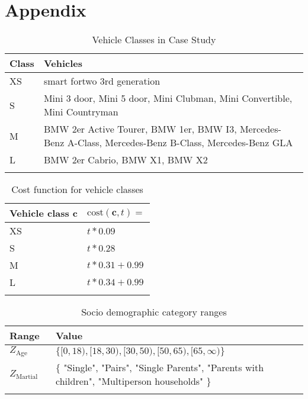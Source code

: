 \clearpage
\section{Appendix}
\label{app:A}

\begin{longtable}{ | l | p{12cm} |}
  \hline
  \textbf{Class} & \textbf{Vehicles} \\
  \hline
  XS & smart fortwo 3rd generation \\
  S & Mini 3 door, Mini 5 door, Mini Clubman, Mini Convertible,  Mini Countryman \\
  M & BMW 2er Active Tourer, BMW 1er, BMW I3, Mercedes-Benz A-Class, Mercedes-Benz B-Class, Mercedes-Benz GLA \\
  L & BMW 2er Cabrio, BMW X1, BMW X2 \\
  \hline

  \caption{Vehicle Classes in Case Study}
  \label{table:VehicleClasses}
\end{longtable}

\begin{longtable}{ | l | p{10cm} |}
  \hline
  Vehicle class \textbf{c} & $\text{cost}(\textbf{c}, t) = $ \\
  \hline
  XS & $t * 0.09$ \\
  S & $t * 0.28$ \\
  M & $t * 0.31 + 0.99$ \\
  L & $t * 0.34 + 0.99$ \\  
  \hline

  \caption{Cost function for vehicle classes}
  \label{table:CostFunction}
\end{longtable}


\begin{longtable}{ | l | p{10cm} |}
  \hline
  \textbf{Range} & \textbf{Value} \\
  \hline
  $Z_{\text{Age}}$ & $\{ [0, 18), [18, 30), [30, 50), [50, 65), [65, \infty)  \}$ \\
  $Z_{\text{Martial status}}$ & $\{$ "Single", "Pairs", "Single Parents", "Parents with children", "Multiperson households" $\}$ \\
  \hline

  \caption{Socio demographic category ranges}
  \label{table:Ranges}
\end{longtable}

